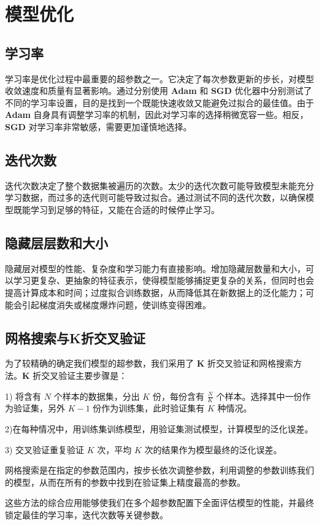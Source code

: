 \section{模型优化}
    \subsection{学习率}
        \par 学习率是优化过程中最重要的超参数之一。它决定了每次参数更新的步长，对模型收敛速度和质量有显著影响。通过分别使用 \textbf{Adam} 和 \textbf{SGD} 优化器中分别测试了不同的学习率设置，目的是找到一个既能快速收敛又能避免过拟合的最佳值。由于 \textbf{Adam} 自身具有调整学习率的机制，因此对学习率的选择稍微宽容一些。相反，\textbf{SGD} 对学习率非常敏感，需要更加谨慎地选择。
    \subsection{迭代次数}
        \par 迭代次数决定了整个数据集被遍历的次数。太少的迭代次数可能导致模型未能充分学习数据，而过多的迭代则可能导致过拟合。通过测试不同的迭代次数，以确保模型既能学习到足够的特征，又能在合适的时候停止学习。
        \subsection{隐藏层层数和大小}
        \par 隐藏层对模型的性能、复杂度和学习能力有直接影响。增加隐藏层数量和大小，可以学习更复杂、更抽象的特征表示，使得模型能够捕捉更复杂的关系，但同时也会提高计算成本和时间；过度拟合训练数据，从而降低其在新数据上的泛化能力；可能会引起梯度消失或梯度爆炸问题，使训练变得困难。
    \subsection{网格搜索与K折交叉验证}
        \par 为了较精确的确定我们模型的超参数，我们采用了 \textbf{K} 折交叉验证和网格搜索方法\cite{ref14}。\textbf{K} 折交叉验证主要步骤是：
        \par 1) 将含有 $N$ 个样本的数据集，分出 $K$ 份，每份含有 $\frac{N}{K}$ 个样本。选择其中一份作为验证集，另外 $K-1$ 份作为训练集，此时验证集有 $K$ 种情况。
        \par 2)在每种情况中，用训练集训练模型，用验证集测试模型，计算模型的泛化误差。
        \par 3) 交叉验证重复验证 $K$ 次，平均 $K$ 次的结果作为模型最终的泛化误差。
        \par 网格搜索是在指定的参数范围内，按步长依次调整参数，利用调整的参数训练我们的模型，从而在所有的参数中找到在验证集上精度最高的参数。
        \par 这些方法的综合应用能够使我们在多个超参数配置下全面评估模型的性能，并最终锁定最佳的学习率，迭代次数等关键参数。
